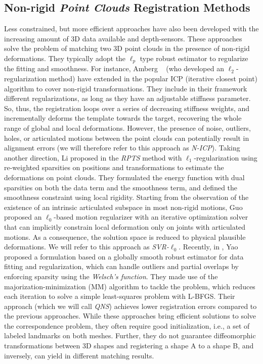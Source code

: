 \subsection{Non-rigid \textit{Point Clouds} Registration Methods}
\label{sec:PointCloud}
Less constrained, but more efficient approaches have  also been developed with the increasing amount of 3D data available and depth-sensors. These approaches solve the problem of matching two 3D point clouds in the presence of non-rigid deformations. They typically adopt the $\ell_p$ type robust estimator to regularize the fitting and smoothness. For instance, Amberg \etal~ (who developed an $\ell_2$-regularization method) have extended in \cite{amberg2007optimal} the popular ICP (iterative closest point) algorithm to cover non-rigid transformations. They include in their framework different regularizations, as long as they have an adjustable stiffness parameter. So, thus, the registration loops over a series of decreasing stiffness weights, and incrementally deforms the template towards the target, recovering the whole range of global and local deformations. However, the presence of noise, outliers, holes, or articulated motions between the point clouds can potentially result in alignment errors (we will therefore refer to this approach as \textit{N-ICP}). Taking another direction, Li \etal proposed in \cite{li2018robust} the \textit{RPTS} method with $\ell_1$-regularization using re-weighted sparsities on positions and transformations to estimate the deformations on point clouds. They formulated the energy function with dual sparsities on both the data term and the smoothness term, and defined the smoothness constraint using local rigidity. Starting from the observation of the existence of an intrinsic articulated subspace in most non-rigid motions, Guo \etal \cite{guo2015robust} proposed an $\ell_0$-based motion regularizer with an iterative optimization solver that can implicitly constrain local deformation only on joints with articulated motions. As a consequence, the solution space is reduced to physical plausible deformations. We will refer to this approach as \textit{SVR-}$\ell_0$. Recently, in \cite{Yao_2020_CVPR}, Yao \etal proposed a formulation based on a globally smooth robust estimator for data fitting and regularization, which can handle outliers and partial overlaps by enforcing sparsity using the \textit{Welsch’s function}. They made use of the majorization-minimization (MM) algorithm to tackle the problem, which reduces each iteration to solve a simple least-squares problem with L-BFGS. Their approach (which we will call \textit{QNS}) achieves lower registration errors compared to the previous approaches. While these approaches bring efficient solutions to solve the correspondence problem, they often require good initialization, i.e., a set of labeled landmarks on both meshes. Further, they do not guarantee diffeomorphic transformations between 3D shapes and registering a shape A to a shape B, and inversely, can yield in different matching results.

